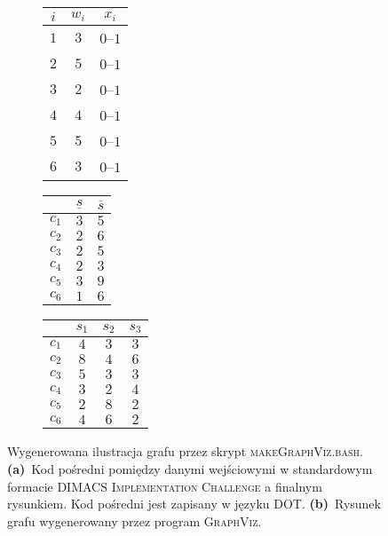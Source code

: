 \begin{figure}[!htbp]
	\null\hfill
	\begin{subfigure}[b]{0.3\textwidth}
		\centering
			\begin{tabular}{ccc}
				\hline
				$i$		& $w_{i}$	& $x_{i}$	\\
				\hline
				$1$		& $3$		& $0$--$1$	\\
				$2$		& $5$		& $0$--$1$	\\
				$3$		& $2$		& $0$--$1$	\\
				$4$		& $4$		& $0$--$1$	\\
				$5$		& $5$		& $0$--$1$	\\
				$6$		& $3$ 		& $0$--$1$	\\
				\hline
			\end{tabular}
		\caption{}
		\label{fig:graphViz:a}
	\end{subfigure}
	\hfill
	\begin{subfigure}[b]{0.3\textwidth}
		\centering
		\begin{tabular}{ccc}
			\cline{2-3}
					& $\underline{s}$	& $\overline{s}$	\\
			\hline
			$c_{1}$ & $3$				& $5$				\\
			$c_{2}$ & $2$				& $6$				\\
			$c_{3}$ & $2$				& $5$				\\
			$c_{4}$ & $2$				& $3$				\\
			$c_{5}$ & $3$				& $9$				\\
			$c_{6}$ & $1$				& $6$				\\
			\hline
		\end{tabular}
		\caption{}
		\label{fig:graphViz:b}
	\end{subfigure}
	\hfill
	\begin{subfigure}[b]{0.3\textwidth}
		\centering
		\begin{tabular}{cccc}
			\cline{2-4}
			& $s_{1}$ 	& $s_{2}$	& $s_{3}$	\\
			\hline
			$c_{1}$ & $4$		& $3$		& $3$		\\
			$c_{2}$	& $8$		& $4$		& $6$		\\
			$c_{3}$ & $5$		& $3$		& $3$		\\
			$c_{4}$	& $3$		& $2$		& $4$		\\
			$c_{5}$	& $2$		& $8$		& $2$		\\
			$c_{6}$	& $4$		& $6$		& $2$		\\
			\hline
		\end{tabular}
		\caption{}
		\label{fig:graphViz:c}
	\end{subfigure}
	\hfill\null
	\caption{
		Wygenerowana ilustracja grafu przez skrypt \textsc{makeGraphViz.bash}.
		\textbf{(a)}~Kod pośredni pomiędzy danymi wejściowymi w standardowym formacie \textsc{DIMACS Implementation Challenge} a finalnym rysunkiem. Kod pośredni jest zapisany w języku \textsc{DOT}.
		\textbf{(b)}~Rysunek grafu wygenerowany przez program \textsc{GraphViz}.
	}
	\label{fig:graphViz}
\end{figure}





